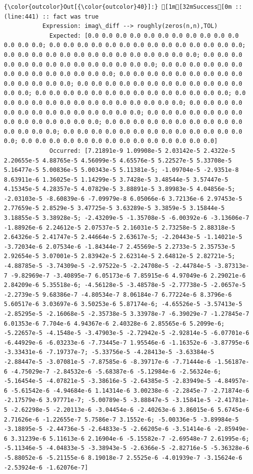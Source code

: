 \documentclass[11pt]{article}
\begin{document}
\begin{Verbatim}[commandchars=\\\{\}]
{\color{outcolor}Out[{\color{outcolor}40}]:} [1m[32mSuccess[0m :: (line:441) :: fact was true
           Expression: imag\_diff --> roughly(zeros(n,n),TOL)
             Expected: [0.0 0.0 0.0 0.0 0.0 0.0 0.0 0.0 0.0 0.0 0.0 0.0 0.0 0.0; 0.0 0.0 0.0 0.0 0.0 0.0 0.0 0.0 0.0 0.0 0.0 0.0 0.0 0.0; 0.0 0.0 0.0 0.0 0.0 0.0 0.0 0.0 0.0 0.0 0.0 0.0 0.0 0.0; 0.0 0.0 0.0 0.0 0.0 0.0 0.0 0.0 0.0 0.0 0.0 0.0 0.0 0.0; 0.0 0.0 0.0 0.0 0.0 0.0 0.0 0.0 0.0 0.0 0.0 0.0 0.0 0.0; 0.0 0.0 0.0 0.0 0.0 0.0 0.0 0.0 0.0 0.0 0.0 0.0 0.0 0.0; 0.0 0.0 0.0 0.0 0.0 0.0 0.0 0.0 0.0 0.0 0.0 0.0 0.0 0.0; 0.0 0.0 0.0 0.0 0.0 0.0 0.0 0.0 0.0 0.0 0.0 0.0 0.0 0.0; 0.0 0.0 0.0 0.0 0.0 0.0 0.0 0.0 0.0 0.0 0.0 0.0 0.0 0.0; 0.0 0.0 0.0 0.0 0.0 0.0 0.0 0.0 0.0 0.0 0.0 0.0 0.0 0.0; 0.0 0.0 0.0 0.0 0.0 0.0 0.0 0.0 0.0 0.0 0.0 0.0 0.0 0.0; 0.0 0.0 0.0 0.0 0.0 0.0 0.0 0.0 0.0 0.0 0.0 0.0 0.0 0.0; 0.0 0.0 0.0 0.0 0.0 0.0 0.0 0.0 0.0 0.0 0.0 0.0 0.0 0.0; 0.0 0.0 0.0 0.0 0.0 0.0 0.0 0.0 0.0 0.0 0.0 0.0 0.0 0.0]
             Occurred: [7.21891e-9 1.09908e-5 2.03142e-5 2.4322e-5 2.20655e-5 4.88765e-5 4.56099e-5 4.65576e-5 5.22527e-5 5.33708e-5 5.16477e-5 5.00836e-5 5.00343e-5 5.11381e-5; -1.09704e-5 -2.9351e-8 8.63911e-6 1.36025e-5 1.14299e-5 3.7428e-5 3.48544e-5 3.57447e-5 4.15345e-5 4.28357e-5 4.07829e-5 3.88891e-5 3.89983e-5 4.04856e-5; -2.03103e-5 -8.60839e-6 -7.09979e-8 6.05066e-6 3.72136e-6 2.97453e-5 2.77659e-5 2.8529e-5 3.47725e-5 3.63289e-5 3.3859e-5 3.15844e-5 3.18855e-5 3.38928e-5; -2.43209e-5 -1.35708e-5 -6.00392e-6 -3.13606e-7 -1.88926e-6 2.24612e-5 2.07537e-5 2.16031e-5 2.73258e-5 2.88318e-5 2.64326e-5 2.41747e-5 2.44664e-5 2.63617e-5; -2.20443e-5 -1.14021e-5 -3.72034e-6 2.07534e-6 -1.84344e-7 2.45569e-5 2.2733e-5 2.35753e-5 2.92654e-5 3.07001e-5 2.83942e-5 2.62314e-5 2.64812e-5 2.82721e-5; -4.88785e-5 -3.74309e-5 -2.97522e-5 -2.24708e-5 -2.44784e-5 -3.87313e-7 -9.82969e-7 -3.40895e-7 6.05173e-6 7.85915e-6 4.97049e-6 2.29021e-6 2.84209e-6 5.35518e-6; -4.56128e-5 -3.48578e-5 -2.77738e-5 -2.0657e-5 -2.2739e-5 9.68386e-7 -4.80534e-7 8.06184e-7 6.77224e-6 8.3796e-6 5.60517e-6 3.03697e-6 3.50253e-6 5.87174e-6; -4.65526e-5 -3.57413e-5 -2.85295e-5 -2.16068e-5 -2.35738e-5 3.33978e-7 -6.39029e-7 -1.27845e-7 6.01353e-6 7.704e-6 4.94367e-6 2.40328e-6 2.85565e-6 5.2099e-6; -5.22657e-5 -4.1548e-5 -3.47903e-5 -2.72942e-5 -2.92814e-5 -6.07701e-6 -6.44929e-6 -6.03233e-6 -7.73445e-7 1.95546e-6 -1.16352e-6 -3.87795e-6 -3.33431e-6 -7.19737e-7; -5.33756e-5 -4.28413e-5 -3.63384e-5 -2.88447e-5 -3.07081e-5 -7.87585e-6 -8.39717e-6 -7.71444e-6 -1.56187e-6 -4.75029e-7 -2.84532e-6 -5.68387e-6 -5.12984e-6 -2.56324e-6; -5.16454e-5 -4.07821e-5 -3.38616e-5 -2.64385e-5 -2.83949e-5 -4.84957e-6 -5.61542e-6 -4.94684e-6 1.14314e-6 3.00238e-6 -2.2845e-7 -2.71874e-6 -2.17579e-6 3.97771e-7; -5.00789e-5 -3.88847e-5 -3.15841e-5 -2.41781e-5 -2.62298e-5 -2.20113e-6 -3.04454e-6 -2.40263e-6 3.86015e-6 5.6745e-6 2.71626e-6 -1.22655e-7 5.7586e-7 3.1552e-6; -5.00336e-5 -3.89984e-5 -3.18895e-5 -2.44736e-5 -2.64833e-5 -2.66205e-6 -3.51414e-6 -2.85949e-6 3.31239e-6 5.11613e-6 2.16904e-6 -5.15582e-7 -2.69548e-7 2.61995e-6; -5.11346e-5 -4.04833e-5 -3.38943e-5 -2.6366e-5 -2.82716e-5 -5.36328e-6 -5.88052e-6 -5.21155e-6 8.19018e-7 2.5525e-6 -4.01939e-7 -3.15624e-6 -2.53924e-6 -1.62076e-7]

\end{Verbatim}
\end{document}
